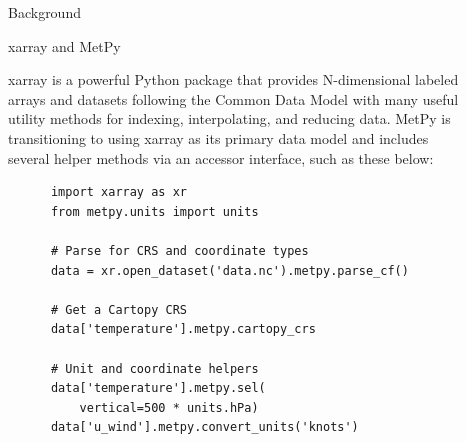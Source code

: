 \documentclass[final]{beamer}
\newlength{\sepwidth}
\newlength{\colwidth}
\newcommand{\separatorcolumn}{\begin{column}{\sepwidth}\end{column}}
\begin{document}
\begin{frame}[t, fragile]
\begin{columns}[t]
\begin{column}{\colwidth}
\begin{block}{Background}
  \end{block}

  \begin{alertblock}{xarray and MetPy}

    xarray is a powerful Python package that provides N-dimensional labeled arrays and datasets following the Common Data Model with many useful utility methods for indexing, interpolating, and reducing data. MetPy is transitioning to using xarray as its primary data model and includes several helper methods via an accessor interface, such as these below:

    \begin{verbatim}
      import xarray as xr
      from metpy.units import units

      # Parse for CRS and coordinate types
      data = xr.open_dataset('data.nc').metpy.parse_cf()

      # Get a Cartopy CRS
      data['temperature'].metpy.cartopy_crs

      # Unit and coordinate helpers
      data['temperature'].metpy.sel(
          vertical=500 * units.hPa)
      data['u_wind'].metpy.convert_units('knots')
    \end{verbatim}

  \end{alertblock}

\end{column}

\separatorcolumn

\begin{column}{\colwidth}

  \begin{exampleblock}

    \vspace{-1.5em}


\end{exampleblock}
\end{column}
\end{columns}
\end{frame}
\end{document}

